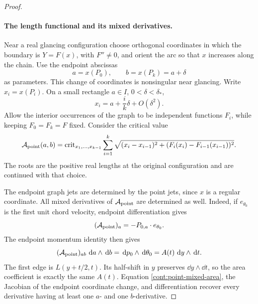 \begin{proof}\leavevmode
\paragraph{The length functional and its mixed derivatives.}
Near a real glancing configuration choose orthogonal coordinates
in which the boundary is \(Y=F(x)\), with \(F''\ne0\), and
orient the arc so that \(x\) increases along the chain.  Use
the endpoint abscissas
\[
 a=x(P_0),\qquad b=x(P_k)=a+\delta
\]
as parameters.  This change of coordinates is nonsingular
near glancing.  Write \(x_i=x(P_i)\).  On a small rectangle
\(a\in I\), \(0<\delta<\delta_*\),
\begin{equation}
 x_i=a+\frac{i}{k}\delta+O(\delta^2).
 \label{cont:point-coalescence}
\end{equation}
Allow the interior occurrences of the graph to be independent
functions \(F_i\), while keeping \(F_0=F_k=F\) fixed.  Consider
the critical value
\begin{equation}
 \mathcal A_{\rm point}(a,b)=
 \operatorname{crit}_{x_1,\ldots,x_{k-1}}
 \sum_{i=1}^k
 \sqrt{(x_i-x_{i-1})^2+
       (F_i(x_i)-F_{i-1}(x_{i-1}))^2}.
 \label{cont:point-critical-value}
\end{equation}
The roots are the positive real lengths at the original
configuration and are continued with that choice.

The endpoint graph jets are determined by the point jets,
since \(x\) is a regular coordinate.  All mixed derivatives
of \(\mathcal A_{\rm point}\) are determined as well.  Indeed,
if \(e_{\theta_0}\) is the first unit chord velocity, endpoint
differentiation gives
\[
 (\mathcal A_{\rm point})_a
       =-P_{0,a}\cdot e_{\theta_0}.
\]
The endpoint momentum identity then gives
\begin{equation}
 (\mathcal A_{\rm point})_{ab}\,\,\mathrm d a\wedge\,\mathrm d b
       =\,\mathrm d p_0\wedge\,\mathrm d\theta_0
       =A(t)\,\,\mathrm d y\wedge\,\mathrm d t.
 \label{cont:point-mixed-area}
\end{equation}
The first edge is \(L(y+t/2,t)\).  Its half-shift in \(y\)
preserves \(\dd y\wedge\dd t\), so the area coefficient is
exactly the same \(A(t)\).  Equation
\eqref{cont:point-mixed-area}, the Jacobian of the endpoint
coordinate change, and differentiation recover every derivative
having at least one \(a\)- and one \(b\)-derivative.


\end{proof}
